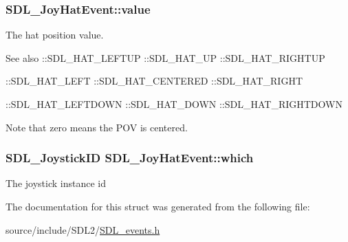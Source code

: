 \subsubsection[{value}]{ S\+D\+L\+\_\+\+Joy\+Hat\+Event\+::value}\label{struct_s_d_l___joy_hat_event_a52b179a34407449941b61d988ca72ef4}
The hat position value. \begin{DoxySeeAlso}{See also}
\+::\+S\+D\+L\+\_\+\+H\+A\+T\+\_\+\+L\+E\+F\+T\+U\+P \+::\+S\+D\+L\+\_\+\+H\+A\+T\+\_\+\+U\+P \+::\+S\+D\+L\+\_\+\+H\+A\+T\+\_\+\+R\+I\+G\+H\+T\+U\+P 

\+::\+S\+D\+L\+\_\+\+H\+A\+T\+\_\+\+L\+E\+F\+T \+::\+S\+D\+L\+\_\+\+H\+A\+T\+\_\+\+C\+E\+N\+T\+E\+R\+E\+D \+::\+S\+D\+L\+\_\+\+H\+A\+T\+\_\+\+R\+I\+G\+H\+T 

\+::\+S\+D\+L\+\_\+\+H\+A\+T\+\_\+\+L\+E\+F\+T\+D\+O\+W\+N \+::\+S\+D\+L\+\_\+\+H\+A\+T\+\_\+\+D\+O\+W\+N \+::\+S\+D\+L\+\_\+\+H\+A\+T\+\_\+\+R\+I\+G\+H\+T\+D\+O\+W\+N
\end{DoxySeeAlso}
Note that zero means the P\+O\+V is centered. \hypertarget{struct_s_d_l___joy_hat_event_ac9d9bb179f9116d16b3da47cacd74b55}{}
\subsubsection[{which}]{\setlength{\rightskip}{0pt plus 5cm}S\+D\+L\+\_\+\+Joystick\+I\+D S\+D\+L\+\_\+\+Joy\+Hat\+Event\+::which}\label{struct_s_d_l___joy_hat_event_ac9d9bb179f9116d16b3da47cacd74b55}
The joystick instance id 

The documentation for this struct was generated from the following file\+:\begin{DoxyCompactItemize}
\item 
source/include/\+S\+D\+L2/\hyperlink{_s_d_l__events_8h}{S\+D\+L\+\_\+events.\+h}\end{DoxyCompactItemize}
